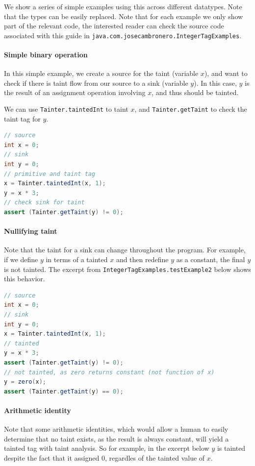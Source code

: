 \documentclass[a4paper]{article}
\begin{document}
We show a series of simple examples using this across different datatypes. Note that the types 
can be easily replaced. Note that for each example we only show part of the relevant code,
the interested reader can check the source code associated with this guide
in \verb|java.com.josecambronero.IntegerTagExamples|.

\paragraph{Simple binary operation}
In this simple example, we create a source for the taint (variable $x$), and want to check
if there is taint flow from our source to a sink (variable $y$). In this case, $y$ is the result
of an assignment operation involving $x$, and thus should be tainted.

We can use \verb|Tainter.taintedInt| to taint $x$, and \verb|Tainter.getTaint| to check the taint
tag for $y$.

\begin{lstlisting}[language=java]
// source
int x = 0;
// sink
int y = 0;
// primitive and taint tag
x = Tainter.taintedInt(x, 1);
y = x * 3;
// check sink for taint
assert (Tainter.getTaint(y) != 0);
\end{lstlisting}



\paragraph{Nullifying taint}
Note that the taint for a sink can change throughout the program. For example,
if we define $y$ in terms of a tainted $x$ and then redefine $y$ as a constant, the final $y$
is not tainted. The excerpt from \verb|IntegerTagExamples.testExample2|  below
shows this behavior.

\begin{lstlisting}[language=java]
// source
int x = 0;
// sink
int y = 0;
x = Tainter.taintedInt(x, 1);
// tainted
y = x * 3;
assert (Tainter.getTaint(y) != 0);
// not tainted, as zero returns constant (not function of x)
y = zero(x);
assert (Tainter.getTaint(y) == 0);
\end{lstlisting}


\paragraph{Arithmetic identity}
Note that some arithmetic identities, which would allow a human to easily determine that no
taint exists, as the result is always constant, will yield a tainted tag with taint analysis.
So for example, in the excerpt below $y$ is tainted despite the fact that it assigned 0, regardles
of the tainted value of $x$.
\end{document}
